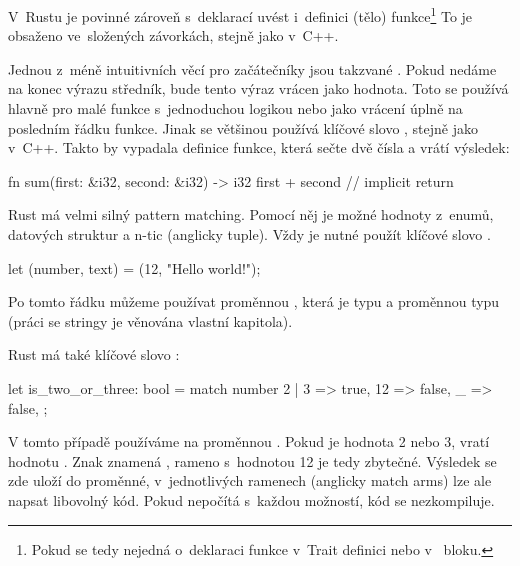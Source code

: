 \documentclass[main.tex]{subfiles}
\begin{document}
V~Rustu je povinné zároveň s~deklarací uvést i~definici (tělo) funkce\footnote{Pokud
    se tedy nejedná o~deklaraci funkce v~Trait definici nebo v~ bloku.
} To je obsaženo ve~složených závorkách, stejně jako v~C++.

Jednou z~méně intuitivních věcí pro začátečníky jsou takzvané .
Pokud nedáme na konec výrazu středník, bude tento výraz vrácen jako hodnota. Toto se
používá hlavně pro malé funkce s~jednoduchou logikou nebo jako vrácení úplně na posledním
řádku funkce. Jinak se většinou používá klíčové slovo , stejně jako v~C++.
Takto by vypadala definice funkce, která sečte dvě čísla a vrátí výsledek:

\obrazek
\begin{rustcode}
    fn sum(first: &i32, second: &i32) -> i32 {
        first + second // implicit return
    }
\end{rustcode}


Rust má velmi silný pattern matching. Pomocí něj je možné  hodnoty
z~enumů, datových struktur a n-tic (anglicky tuple). Vždy je nutné použít klíčové
slovo .

\obrazek
\begin{rustcode}
    let (number, text) = (12, "Hello world!");
\end{rustcode}

Po tomto řádku můžeme používat proměnnou , která je typu  a
proměnnou  typu  (práci se stringy je věnována vlastní kapitola).

Rust má také klíčové slovo :

\obrazek
\begin{rustcode}
    let is_two_or_three: bool = match number {
        2 | 3 => true,
        12 => false,
        _ => false,
    };
\end{rustcode}

V tomto případě používáme  na proměnnou . Pokud je hodnota
2 nebo 3, vratí  hodnotu . Znak \irust{_} znamená
, rameno s~hodnotou 12 je tedy zbytečné. Výsledek se zde uloží do
proměnné, v~jednotlivých ramenech (anglicky match arms) lze ale napsat libovolný kód.
Pokud  nepočítá s~každou možností, kód se nezkompiluje.
\end{document}
